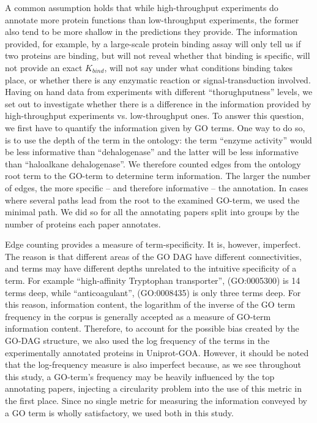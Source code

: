 \documentclass[10pt]{article}
\begin{document}
A common assumption holds that while high-throughput experiments do annotate more protein
functions than low-throughput experiments, the former also tend to be more shallow in the
predictions they provide. The information provided, for example, by a large-scale protein
binding assay will only tell us if two proteins are binding, but will not reveal whether
that binding is specific, will not provide an exact $K_{bind}$, will not say under what
conditions binding takes place, or whether there is any enzymatic reaction or
signal-transduction involved. Having on hand data from experiments with different
``thorughputness'' levels,  we set out to investigate whether there is a difference in the
information provided by high-throughput experiments vs. low-throughput ones. To answer this
question, we first have to quantify the information given by GO terms. One way to do so, is
to use the depth of the term in the ontology: the term ``enzyme activity'' would be less
informative than ``dehalogenase'' and the latter will be less informative than ``haloalkane
dehalogenase''.  We therefore counted edges from the ontology root term to the GO-term to
determine term information. The larger the number of edges, the more specific -- and
therefore informative -- the annotation. In cases where several paths lead from the root to
the examined GO-term, we used the minimal path. We did so for all the annotating papers
split into groups by the number of proteins each paper annotates. 


Edge counting provides a measure of term-specificity. It is, however, imperfect. The reason is
that different areas of the GO DAG have different connectivities, and terms may have different
depths unrelated to the intuitive specificity of a term. For example ``high-affinity
Tryptophan transporter'', (GO:0005300) is 14 terms deep, while ``anticoagulant'', (GO:0008435)
is only three terms deep.  For this reason, information content, the logarithm of the inverse
of the GO term frequency in the corpus is generally accepted as a measure of GO-term
information content\cite{lord-semsim}. Therefore, to account for the possible bias created by
the GO-DAG structure, we also used the log frequency of the terms in the experimentally
annotated proteins in Uniprot-GOA. However, it should be noted that the log-frequency measure
is also imperfect because, as we see throughout this study, a GO-term's frequency may be
heavily influenced  by the top annotating papers, injecting a circularity problem into the use
of this metric in the first place.
Since no single metric for measuring the information
conveyed by a GO term is wholly satisfactory, we used both in this study.
\end{document}

